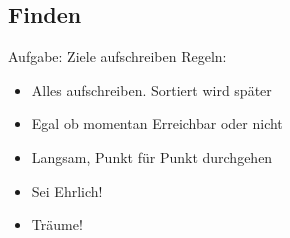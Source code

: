 \subsection{Finden}


\begin{frame}[c]{Aufgabe: Ziele aufschreiben}
    Regeln:
    \begin{itemize}[<+(1)->]
        \item Alles aufschreiben. Sortiert wird später
        \item Egal ob momentan Erreichbar oder nicht
        \item Langsam, Punkt für Punkt durchgehen
        \item Sei Ehrlich!
        \item Träume!
    \end{itemize}
\end{frame}



